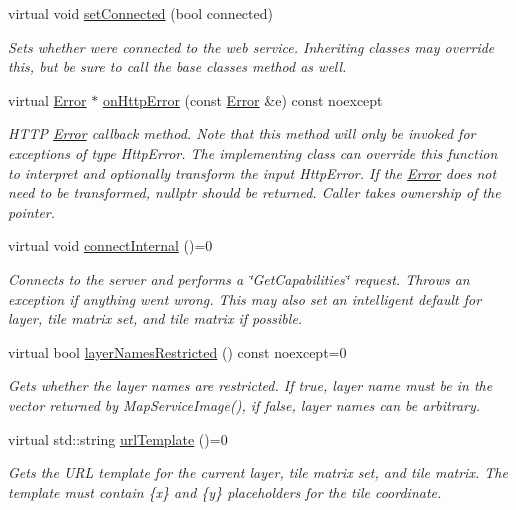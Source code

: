 \begin{DoxyCompactItemize}
\item 
virtual void \hyperlink{group___imagery_module_gadf7a167ee936ff1819c8ede7933cc6db}{set\+Connected} (bool connected)
\begin{DoxyCompactList}\small\item\em Sets whether we\textquotesingle{}re connected to the web service. Inheriting classes may override this, but be sure to call the base classe\textquotesingle{}s method as well. \end{DoxyCompactList}\item 
virtual \hyperlink{classdg_1_1deepcore_1_1_error}{Error} $\ast$ \hyperlink{classdg_1_1deepcore_1_1imagery_1_1_map_service_client_ae53b20c2986e1b9898c77b2065cbdd54}{on\+Http\+Error} (const \hyperlink{classdg_1_1deepcore_1_1_error}{Error} \&e) const noexcept
\begin{DoxyCompactList}\small\item\em H\+T\+TP \hyperlink{classdg_1_1deepcore_1_1_error}{Error} callback method. Note that this method will only be invoked for exceptions of type Http\+Error. The implementing class can override this function to interpret and optionally transform the input Http\+Error. If the \hyperlink{classdg_1_1deepcore_1_1_error}{Error} does not need to be transformed, nullptr should be returned. Caller takes ownership of the pointer. \end{DoxyCompactList}\item 
virtual void \hyperlink{group___imagery_module_gabba13ea72115a1196ed44e35cc17f1b9}{connect\+Internal} ()=0
\begin{DoxyCompactList}\small\item\em Connects to the server and performs a \char`\"{}\+Get\+Capabilities\char`\"{} request. Throws an exception if anything went wrong. This may also set an intelligent default for layer, tile matrix set, and tile matrix if possible. \end{DoxyCompactList}\item 
virtual bool \hyperlink{group___imagery_module_ga900665eb2167743cdac5e46ac536c209}{layer\+Names\+Restricted} () const noexcept=0
\begin{DoxyCompactList}\small\item\em Gets whether the layer names are restricted. If true, layer name must be in the vector returned by Map\+Service\+Image(), if false, layer names can be arbitrary. \end{DoxyCompactList}\item 
virtual std\+::string \hyperlink{group___imagery_module_gaafa4e8cc2a047f6467e227603ccf1a23}{url\+Template} ()=0
\begin{DoxyCompactList}\small\item\em Gets the U\+RL template for the current layer, tile matrix set, and tile matrix. The template must contain \{x\} and \{y\} placeholders for the tile coordinate. \end{DoxyCompactList}\end{DoxyCompactItemize}


